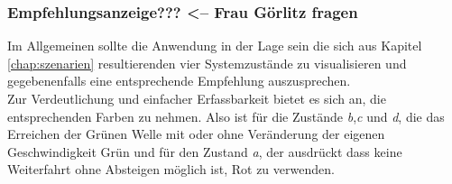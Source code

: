 \subsubsection{Empfehlungsanzeige??? <-- Frau Görlitz fragen}
Im Allgemeinen sollte die Anwendung in der Lage sein die sich aus Kapitel \ref{chap:szenarien} resultierenden vier Systemzustände zu visualisieren und gegebenenfalls eine entsprechende Empfehlung auszusprechen.\\
Zur Verdeutlichung und einfacher Erfassbarkeit bietet es sich an, die entsprechenden Farben zu nehmen. Also ist für die Zustände \textit{b},\textit{c} und \textit{d}, die das Erreichen der Grünen Welle mit oder ohne Veränderung der eigenen Geschwindigkeit Grün und für den Zustand \textit{a}, der ausdrückt dass keine Weiterfahrt ohne Absteigen möglich ist, Rot zu verwenden.
